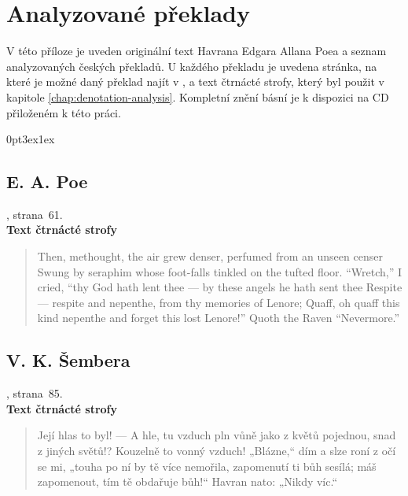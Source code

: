 \documentclass[dp.tex]{subfiles}
\begin{document}

\chapter{Analyzované překlady}

V této příloze je uveden originální text Havrana Edgara Allana Poea a seznam analyzovaných českých překladů. U každého překladu je uvedena stránka, na které je možné daný překlad najít v \cite{Poe1990}, a text čtrnácté strofy, který byl použit v kapitole \ref{chap:denotation-analysis}. Kompletní znění básní je k dispozici na CD přiloženém k této práci.

\titlespacing*{\section}
{0pt}{3ex}{1ex}

\section*{E. A. Poe}

, strana~61.
\\\textbf{Text čtrnácté strofy}
\begin{verse}
Then, methought, the air grew denser, perfumed from an unseen censer 
Swung by seraphim whose foot-falls tinkled on the tufted floor. 
“Wretch,” I cried, “thy God hath lent thee — by these angels he hath sent thee 
Respite — respite and nepenthe, from thy memories of Lenore; 
Quaff, oh quaff this kind nepenthe and forget this lost Lenore!” 
Quoth the Raven “Nevermore.” 
\end{verse}

\section*{V. K. Šembera}
, strana~85.
\\\textbf{Text čtrnácté strofy}
\begin{verse}
Její hlas to byl! — A hle, tu vzduch pln vůně jako z květů
 pojednou, snad z jiných světů!? Kouzelně to vonný vzduch!
 „Blázne,“ dím a slze roní z očí se mi, „touha po ní
 by tě více nemořila, zapomenutí ti bůh
 sesílá; máš zapomenout, tím tě obdařuje bůh!“
        Havran nato: „Nikdy víc.“
\end{verse}
\end{document}
